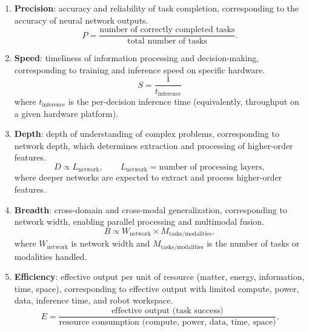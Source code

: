 \documentclass[12pt,a4paper]{article}
\begin{document}
\begin{enumerate}
\item \textbf{Precision}: accuracy and reliability of task completion, corresponding to the accuracy of neural network outputs.
\begin{equation}
P=\frac{\text{number of correctly completed tasks}}{\text{total number of tasks}}.
\label{eq:eval-precision}
\end{equation}
\item \textbf{Speed}: timeliness of information processing and decision-making, corresponding to training and inference speed on specific hardware.
\begin{equation}
S=\frac{1}{t_{\mathrm{inference}}}
\label{eq:eval-speed}
\end{equation}
where $t_{\mathrm{inference}}$ is the per-decision inference time (equivalently, throughput on a given hardware platform).
\item \textbf{Depth}: depth of understanding of complex problems, corresponding to network depth, which determines extraction and processing of higher-order features.
\begin{equation}
D\propto L_{\mathrm{network}},\qquad L_{\mathrm{network}}=\text{number of processing layers},
\label{eq:eval-depth}
\end{equation}
where deeper networks are expected to extract and process higher-order features.
\item \textbf{Breadth}: cross-domain and cross-modal generalization, corresponding to network width, enabling parallel processing and multimodal fusion.
\begin{equation}
B\propto W_{\mathrm{network}}\times M_{\mathrm{tasks/modalities}},
\label{eq:eval-breadth}
\end{equation}
where $W_{\mathrm{network}}$ is network width and $M_{\mathrm{tasks/modalities}}$ is the number of tasks or modalities handled.
\item \textbf{Efficiency}: effective output per unit of resource (matter, energy, information, time, space), corresponding to effective output with limited compute, power, data, inference time, and robot workspace.
\begin{equation}
E=\frac{\text{effective output (task success)}}{\text{resource consumption (compute, power, data, time, space)}}.
\label{eq:eval-efficiency}
\end{equation}
\end{enumerate}
\end{document}
